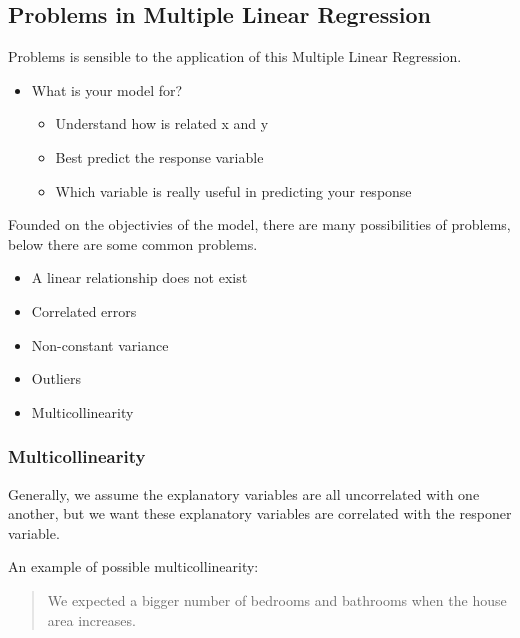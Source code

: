 \documentclass[]{book}
\providecommand{\tightlist}{%
  \setlength{\itemsep}{0pt}\setlength{\parskip}{0pt}}
\begin{document}
\subsection{Problems in Multiple Linear
Regression}\label{problems-in-multiple-linear-regression}

Problems is sensible to the application of this Multiple Linear
Regression.

\begin{itemize}
\tightlist
\item
  What is your model for?

  \begin{itemize}
  \tightlist
  \item
    Understand how is related x and y
  \item
    Best predict the response variable
  \item
    Which variable is really useful in predicting your response
  \end{itemize}
\end{itemize}

Founded on the objectivies of the model, there are many possibilities of
problems, below there are some common problems.

\begin{itemize}
\tightlist
\item
  A linear relationship does not exist
\item
  Correlated errors
\item
  Non-constant variance
\item
  Outliers
\item
  Multicollinearity
\end{itemize}

\subsubsection*{Multicollinearity}\label{multicollinearity}

Generally, we assume the explanatory variables are all uncorrelated with
one another, but we want these explanatory variables are correlated with
the responer variable.

An example of possible multicollinearity:

\begin{quote}
We expected a bigger number of bedrooms and bathrooms when the house
area increases.
\end{quote}
\end{document}

